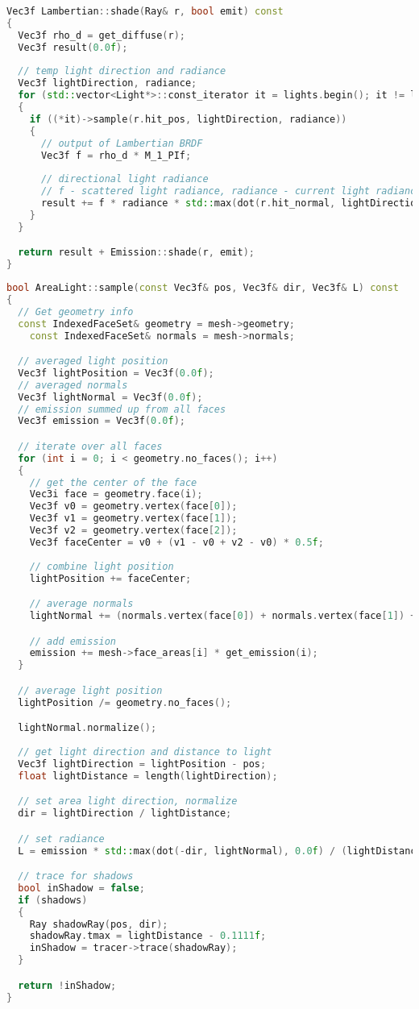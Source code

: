 \begin{lstlisting}[language=C++,caption=Lambertian.cpp,label=lst:lambertian,firstnumber=16]
Vec3f Lambertian::shade(Ray& r, bool emit) const
{
  Vec3f rho_d = get_diffuse(r);
  Vec3f result(0.0f);
  
  // temp light direction and radiance
  Vec3f lightDirection, radiance;
  for (std::vector<Light*>::const_iterator it = lights.begin(); it != lights.end(); it++)
  {
    if ((*it)->sample(r.hit_pos, lightDirection, radiance))
    {
      // output of Lambertian BRDF
      Vec3f f = rho_d * M_1_PIf;
      
      // directional light radiance
      // f - scattered light radiance, radiance - current light radiance, last term: cosine cut off at 0
      result += f * radiance * std::max(dot(r.hit_normal, lightDirection), 0.0f);
    }
  }

  return result + Emission::shade(r, emit);
}
\end{lstlisting}

\begin{lstlisting}[language=C++,caption=AreaLight.cpp,label=lst:arealight, firstnumber=18]
bool AreaLight::sample(const Vec3f& pos, Vec3f& dir, Vec3f& L) const
{  
  // Get geometry info
  const IndexedFaceSet& geometry = mesh->geometry;
	const IndexedFaceSet& normals = mesh->normals;

  // averaged light position
  Vec3f lightPosition = Vec3f(0.0f);
  // averaged normals
  Vec3f lightNormal = Vec3f(0.0f);
  // emission summed up from all faces
  Vec3f emission = Vec3f(0.0f);

  // iterate over all faces
  for (int i = 0; i < geometry.no_faces(); i++)
  {
    // get the center of the face
    Vec3i face = geometry.face(i);
    Vec3f v0 = geometry.vertex(face[0]);
    Vec3f v1 = geometry.vertex(face[1]);
    Vec3f v2 = geometry.vertex(face[2]);
    Vec3f faceCenter = v0 + (v1 - v0 + v2 - v0) * 0.5f;
    
    // combine light position
    lightPosition += faceCenter;

    // average normals
    lightNormal += (normals.vertex(face[0]) + normals.vertex(face[1]) + normals.vertex(face[2])) / 3;

    // add emission
    emission += mesh->face_areas[i] * get_emission(i);
  }

  // average light position
  lightPosition /= geometry.no_faces();

  lightNormal.normalize();
  
  // get light direction and distance to light
  Vec3f lightDirection = lightPosition - pos;
  float lightDistance = length(lightDirection);

  // set area light direction, normalize
  dir = lightDirection / lightDistance;

  // set radiance
  L = emission * std::max(dot(-dir, lightNormal), 0.0f) / (lightDistance * lightDistance);

  // trace for shadows
  bool inShadow = false;
  if (shadows)
  {
    Ray shadowRay(pos, dir);
    shadowRay.tmax = lightDistance - 0.1111f;
    inShadow = tracer->trace(shadowRay);
  }

  return !inShadow;
}
\end{lstlisting}